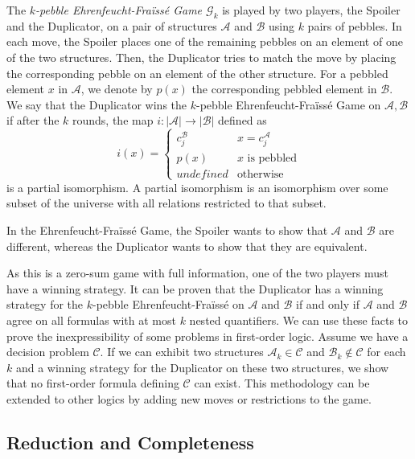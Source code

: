\begin{define}
    The \emph{$k$-pebble Ehrenfeucht-Fraïssé Game $\mathcal{G}_k$} is played by two players, the Spoiler and the Duplicator, on a pair of structures $\mathcal{A}$ and $\mathcal{B}$ using $k$ pairs of pebbles.
    In each move, the Spoiler places one of the remaining pebbles on an element of one of the two structures.
    Then, the Duplicator tries to match the move by placing the corresponding pebble on an element of the other structure.
    For a pebbled element $x$ in $\mathcal{A}$, we denote by $p(x)$ the corresponding pebbled element in $\mathcal{B}$.
    We say that the Duplicator wins the $k$-pebble Ehrenfeucht-Fraïssé Game on $\mathcal{A}, \mathcal{B}$ if after the $k$ rounds, the map $i : |\mathcal{A}| \to |\mathcal{B}|$ defined as
    \[
        i(x) = \begin{cases}
                   c_{j}^{\mathcal{B}} & x = c_{j}^{\mathcal{A}} \\
                   p(x) & x\text{ is pebbled}\\
                   undefined & \text{otherwise}
        \end{cases}
    \]
    is a partial isomorphism.
    A partial isomorphism is an isomorphism over some subset of the universe with all relations restricted to that subset.
\end{define}

In the Ehrenfeucht-Fraïssé Game, the Spoiler wants to show that $\mathcal{A}$ and $\mathcal{B}$ are different, whereas the Duplicator wants to show that they are equivalent.

As this is a zero-sum game with full information, one of the two players must have a winning strategy.
It can be proven that the Duplicator has a winning strategy for the $k$-pebble Ehrenfeucht-Fraïssé on $\mathcal{A}$ and $\mathcal{B}$ if and only if $\mathcal{A}$ and $\mathcal{B}$ agree on all formulas with at most $k$ nested quantifiers.
We can use these facts to prove the inexpressibility of some problems in first-order logic.
Assume we have a decision problem $\mathcal{C}$.
If we can exhibit two structures $\mathcal{A}_k \in \mathcal{C}$ and $\mathcal{B}_k \not \in \mathcal{C}$ for each $k$ and a winning strategy for the Duplicator on these two structures, we show that no first-order formula defining $\mathcal{C}$ can exist.
This methodology can be extended to other logics by adding new moves or restrictions to the game.


\subsection{Reduction and Completeness}\label{subsec:reduction}

